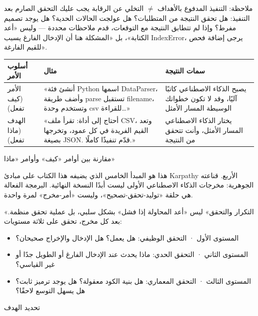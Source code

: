 \begin{tcbwarn}{ملاحظة: التنفيذ المدفوع بالأهداف $\neq$ التخلي عن الرقابة}
يجب عليك التحقق الصارم بعد التنفيذ: هل تحقق النتيجة من المتطلبات؟ هل عولجت الحالات الحدية؟ هل يوجد تصميم مفرط؟ وإذا لم تتطابق النتيجة مع التوقعات، قدم ملاحظات محددة — وليس «أعد الكتابة»، بل «المشكلة هنا أن الإدخال الفارغ يسبب IndexError، يرجى إضافة فحص للقيم الفارغة».

\end{tcbwarn}

\begin{center}
\begin{tabularx}{\linewidth}{|X|X|X|}
\hline
\textbf{أسلوب الأمر} & \textbf{مثال} & \textbf{سمات النتيجة} \tabularnewline
\hline
الأمر (كيف تفعل) & «أنشئ فئة Python اسمها DataParser، وأضف طريقة parse تستقبل filename، وتستخدم وحدة csv للقراءة…» & يصبح الذكاء الاصطناعي كاتبًا آليًا، وقد لا تكون خطواتك الوسيطة المسار الأمثل \tabularnewline
الهدف (ماذا تفعل) & «أحتاج إلى أداة: تقرأ ملف CSV، وتعد القيم الفريدة في كل عمود، وتخرجها بصيغة JSON. قدّم تنفيذًا كاملًا.» & يختار الذكاء الاصطناعي المسار الأمثل، وأنت تتحقق من النتيجة \tabularnewline
\hline
\end{tabularx}
\end{center}

\begin{center}\small\color{gray}مقارنة بين أوامر «كيف» وأوامر «ماذا»\end{center}


هذا هو المبدأ الخامس الذي يضيفه هذا الكتاب على مبادئ Karpathy الأربع. قناعته الجوهرية: مخرجات الذكاء الاصطناعي الأولى ليست أبدًا النسخة النهائية. البرمجة الفعالة هي حلقة «توليد-تحقق-تصحيح»، وليست «أمر-مخرج» لمرة واحدة.

«التكرار والتحقق» ليس «أعد المحاولة إذا فشل» بشكل سلبي، بل عملية تحقق منظمة. بعد كل مخرج، تحقق على ثلاثة مستويات:

\begin{itemize}
  \item المستوى الأول · التحقق الوظيفي: هل يعمل؟ هل الإدخال والإخراج صحيحان؟
  \item المستوى الثاني · التحقق الحدي: ماذا يحدث عند الإدخال الفارغ أو الطويل جدًا أو غير القياسي؟
  \item المستوى الثالث · التحقق المعماري: هل بنية الكود معقولة؟ هل يوجد ترميز ثابت؟ هل يسهل التوسع لاحقًا؟
\end{itemize}

تحديد الهدف


